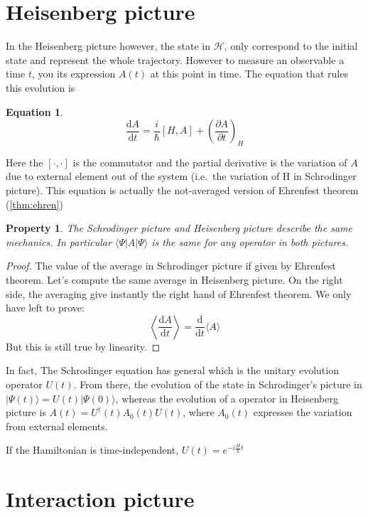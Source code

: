 \documentclass[10pt]{report}
\theoremstyle{plain}
\newtheorem{prop}[thm]{Property}
\theoremstyle{definition}
\newtheorem{eqn}[thm]{Equation}
\theoremstyle{remark}
\newcommand{\ket}[1]{|#1\rangle}
\newcommand{\bra}[1]{\langle#1|}
\newcommand{\dd}{\mathrm{d}}
\newcommand{\der}[2]{\frac{\dd{#1}}{\dd{#2}}}
\newcommand{\dpar}[2]{\frac{\partial{#1}}{\partial{#2}}}
\begin{document}
\section{Heisenberg picture}

In the Heisenberg picture however, the state in $\mathcal{H}$, only correspond
to the initial state and represent the whole trajectory. However to measure an
observable a time $t$, you its expression $A(t)$ at this point in time. The
equation that rules this evolution is



\begin{eqn}
  \[\der At   = \frac i {\hbar}[H,A] + {\left(\dpar At \right)}_{\!\!H}\]
\end{eqn}

Here the $[\cdot,\cdot]$ is the commutator and the partial derivative is the
variation of $A$ due to external element out of the system (i.e.~the variation
of H in Schrodinger picture). This equation is actually the not-averaged version
of Ehrenfest theorem (\ref{thm:ehren})

\begin{prop}
  The Schrodinger picture and Heisenberg picture describe the same mechanics. In
  particular $\bra \Psi A \ket \Psi$ is the same for any operator in both pictures.
\end{prop}

\begin{proof}
  The value of the average in Schrodinger picture if given by Ehrenfest theorem.
  Let's compute the same average in Heisenberg picture. On the right side, the
  averaging give instantly the right hand of Ehrenfest theorem. We only have
  left to prove:
  \[ \left \langle \der A t\right\rangle = \der{}t\langle A\rangle\]
  But this is still true by linearity.
\end{proof}

In fact, The Schrodinger equation has general which is the unitary evolution
operator $U(t)$. From there, the evolution of the state in Schrodinger's picture
in $\ket {\Psi(t)} = U(t) \ket {\Psi(0)}$, whereas the evolution of a operator
in Heisenberg picture is $A(t) = U^\dagger(t)A_0(t)U(t)$, where $A_0(t)$
expresses the variation from external elements.

If the Hamiltonian is time-independent, $U(t) = e^{-i\frac H\hbar t}$

\section{Interaction picture}
\end{document}
